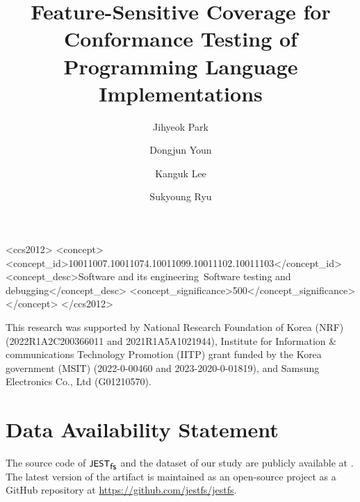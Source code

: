 \documentclass[acmsmall,screen]{acmart}
\begin{document}
\title[Feature-Sensitive Coverage for Conformance Testing]
{Feature-Sensitive Coverage for Conformance Testing of Programming Language
Implementations}

\author{Jihyeok Park}

\author{Dongjun Youn}

\author{Kanguk Lee}

\author{Sukyoung Ryu}



\begin{CCSXML}
  <ccs2012>
  <concept>
  <concept_id>10011007.10011074.10011099.10011102.10011103</concept_id>
  <concept_desc>Software and its engineering~Software testing and debugging</concept_desc>
  <concept_significance>500</concept_significance>
  </concept>
  </ccs2012>
\end{CCSXML}



\maketitle









\begin{acks}
This research was supported by National Research Foundation of Korea (NRF)
(2022R1A2C200366011 and 2021R1A5A1021944), Institute for Information \&
communications Technology Promotion (IITP) grant funded by the Korea government
(MSIT) (2022-0-00460 and 2023-2020-0-01819), and Samsung Electronics Co., Ltd
(G01210570).
\end{acks}

\section{Data Availability Statement}\label{sec:data}

The source code of $\textsf{\small JEST}_{\textsf{\small fs}}$ and the dataset of our study are publicly available
at \cite{artifact}. The latest version of the artifact is maintained as an
open-source project as a GitHub repository at
\url{https://github.com/jestfs/jestfs}.

\balance

\end{document}

